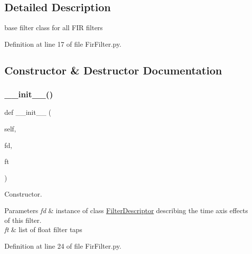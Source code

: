 \subsection{Detailed Description}
base filter class for all F\+IR filters 

Definition at line 17 of file Fir\+Filter.\+py.



\subsection{Constructor \& Destructor Documentation}
\mbox{\label{classSignalIntegrity_1_1TimeDomain_1_1Filters_1_1FirFilter_1_1FirFilter_aa769a401c278ca11fba676e33af50456}} 
\subsubsection{\texorpdfstring{\+\_\+\+\_\+init\+\_\+\+\_\+()}{\_\_init\_\_()}}
{\footnotesize\ttfamily def \+\_\+\+\_\+init\+\_\+\+\_\+ (\begin{DoxyParamCaption}\item[{}]{self,  }\item[{}]{fd,  }\item[{}]{ft }\end{DoxyParamCaption})}



Constructor. 


\begin{DoxyParams}{Parameters}
{\em fd} & instance of class \hyperlink{namespaceSignalIntegrity_1_1TimeDomain_1_1Filters_1_1FilterDescriptor}{Filter\+Descriptor} describing the time axis effects of this filter. \\
\hline
{\em ft} & list of float filter taps \\
\hline
\end{DoxyParams}


Definition at line 24 of file Fir\+Filter.\+py.



